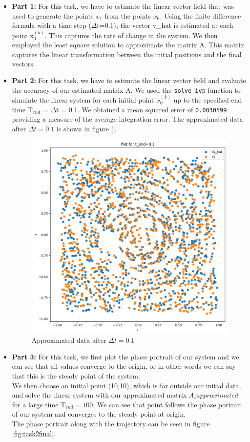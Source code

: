 \begin{itemize}
    \item \textbf{Part 1:} For this task, we have to estimate the linear vector field that was used to generate the points {$x_1$} from the points {$x_0$}. Using the finite difference formula with a time step ($\Delta$t=0.1), the vector v\_hat is estimated at each point x$_0^{(k)}$. This captures the rate of change in the system. We then employed the least square solution to approximate the matrix A. This matrix captures the linear transformation between the initial positions and the final vectors.

    \item \textbf{Part 2:} For this task, we have to estimate the linear vector field and evaluate the accuracy of our estimated matrix A. We used the \texttt{solve\_ivp} function to simulate the linear system for each initial point $x^{(k)}_0$ up to the specified end time T$_{end}$ = $\Delta$t = 0.1. We obtained a mean squared error of \texttt{0.0030599} providing a measure of the average integration error. The approximated data after $\Delta{t}=0.1$ is shown in figure \ref{fig:task2data01}.
    
    \begin{figure}[H]
        \centering
        \includegraphics[width=0.6\linewidth]{images/Ex5task2_01.png}
        \caption{Approximated data after $\Delta{t}=0.1$}
        \label{fig:task2data01}
    \end{figure}

    \item \textbf{Part 3:} For this task, we first plot the phase portrait of our system and we can see that all values converge to the origin, or in other words we can say that this is the steady point of the system.\\
    We then choose an initial point (10,10), which is far outside our initial data, and solve the linear system with our approximated matrix $A\_approximated$ for a large time T$_{end}=100$. We can see that point follows the phase portrait of our system and converges to the steady point at origin.\\
    The phase portrait along with the trajectory can be seen in figure \ref{fig:task2final}.


\end{itemize}
